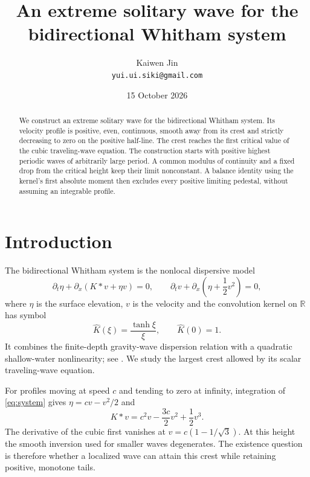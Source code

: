 \documentclass[11pt,a4paper]{article}
\title{An extreme solitary wave for the bidirectional Whitham system}
\author{Kaiwen Jin\\\small\texttt{yui.ui.siki@gmail.com}}
\date{15 October 2026}
\theoremstyle{remark}
\newcommand{\R}{\mathbb R}
\begin{document}
\maketitle

\begin{abstract}
We construct an extreme solitary wave for the bidirectional Whitham
system. Its velocity profile is positive, even, continuous, smooth away
from its crest and strictly decreasing to zero on the positive half-line.
The crest reaches the first critical value of the cubic traveling-wave
equation. The construction starts with positive highest periodic waves
of arbitrarily large period. A common modulus of continuity and a fixed
drop from the critical height keep their limit nonconstant. A balance
identity using the kernel's first absolute moment then excludes every
positive limiting pedestal, without assuming an integrable profile.
\end{abstract}

\section{Introduction}\label{sec:intro}

The bidirectional Whitham system is the nonlocal dispersive model
\begin{equation}\label{eq:system}
 \partial_t\eta+\partial_x(K*v+\eta v)=0,\qquad
 \partial_tv+\partial_x\left(\eta+\frac12v^2\right)=0,
\end{equation}
where $\eta$ is the surface elevation, $v$ is the velocity and the
convolution kernel on $\R$ has symbol
\begin{equation}\label{eq:symbol-intro}
 \widehat K(\xi)=\frac{\tanh\xi}{\xi},\qquad \widehat K(0)=1.
\end{equation}
It combines the finite-depth gravity-wave dispersion relation with a
quadratic shallow-water nonlinearity; see \cite{EJC,NW}. We study the
largest crest allowed by its scalar traveling-wave equation.

For profiles moving at speed $c$ and tending to zero at infinity,
integration of \eqref{eq:system} gives $\eta=cv-v^2/2$ and
\begin{equation}\label{eq:profile-intro}
 K*v=c^2v-\frac{3c}{2}v^2+\frac12v^3.
\end{equation}
The derivative of the cubic first vanishes at
$v=c(1-1/\sqrt3)$. At this height the smooth inversion used for smaller
waves degenerates. The existence question is therefore whether a
localized wave can attain this crest while retaining positive, monotone
tails.
\end{document}

